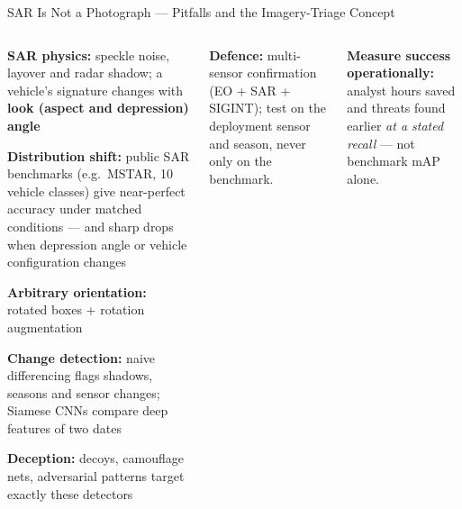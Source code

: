 \documentclass[aspectratio=169,10pt,t]{beamer}
\begin{document}
\begin{frame}{SAR Is Not a Photograph --- Pitfalls and the Imagery-Triage Concept}
\begin{columns}[T]
\begin{tl}\scriptsize
\item \textbf{SAR physics:} speckle noise, layover and radar shadow; a vehicle's signature changes with \textbf{look (aspect and depression) angle}
\item \textbf{Distribution shift:} public SAR benchmarks (e.g.\ MSTAR, 10 vehicle classes) give near-perfect accuracy under matched conditions --- and sharp drops when depression angle or vehicle configuration changes
\item \textbf{Arbitrary orientation:} rotated boxes + rotation augmentation
\item \textbf{Change detection:} naive differencing flags shadows, seasons and sensor changes; Siamese CNNs compare deep features of two dates
\item \textbf{Deception:} decoys, camouflage nets, adversarial patterns target exactly these detectors
\end{tl}
\begin{wbox}\scriptsize\textbf{Defence:} multi-sensor confirmation (EO + SAR + SIGINT); test on the deployment sensor and season, never only on the benchmark.\end{wbox}
\begin{rbox}\scriptsize\textbf{Measure success operationally:} analyst hours saved and threats found earlier \emph{at a stated recall} --- not benchmark mAP alone.\end{rbox}
\end{columns}
\end{frame}
\end{document}
